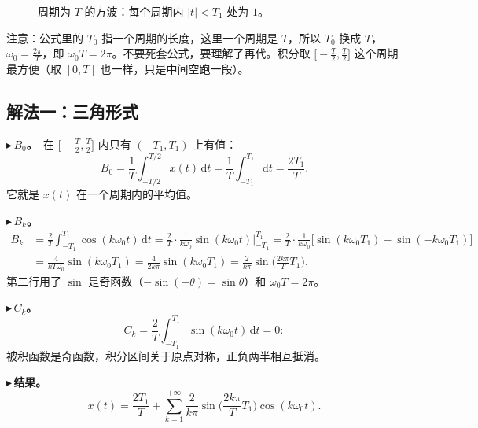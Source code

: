 \documentclass[UTF8,a4paper,11pt]{ctexart}
\newcommand{\taxes}[5][t]{%
  \draw[->] (#2,0) -- (#3,0) node[right,font=\scriptsize] {$#1$};
  \draw[->] (0,#5) -- (0,#4);
  \node[anchor=north east,font=\tiny,gray!60!black,inner sep=1pt] at (0,-0.02) {$0$};}
\newcommand{\xt}[2]{\draw (#1,0) -- (#1,-0.1) node[anchor=north,font=\tiny,gray!60!black,fill=white,inner sep=0.6pt] {$#2$};}
\newcounter{ex}[section]
\newcommand{\point}[1]{\par\addvspace{1ex}\noindent\textcolor{ptteal}{$\blacktriangleright$\,\textbf{#1}}\ }
\begin{document}
\begin{figure}[H]
\centering
{}
\caption{周期为 $T$ 的方波：每个周期内 $|t|<T_1$ 处为 $1$。}
\end{figure}

注意：公式里的 $T_0$ 指一个周期的长度，这里一个周期是 $T$，所以 $T_0$ 换成 $T$，$\omega_0=\frac{2\pi}{T}$，即 $\omega_0T=2\pi$。不要死套公式，要理解了再代。积分取 $\big[-\frac T2,\frac T2\big]$ 这个周期最方便（取 $[0,T]$ 也一样，只是中间空跑一段）。

\subsection{解法一：三角形式}
\point{$B_0$。}在 $\big[-\frac T2,\frac T2\big]$ 内只有 $(-T_1,T_1)$ 上有值：
\[
B_0=\frac1T\int_{-T/2}^{T/2}x(t)\,\mathrm{d}t=\frac1T\int_{-T_1}^{T_1}\mathrm{d}t=\frac{2T_1}{T}.
\]
它就是 $x(t)$ 在一个周期内的平均值。

\point{$B_k$。}
\begin{align*}
B_k&=\frac2T\int_{-T_1}^{T_1}\cos(k\omega_0t)\,\mathrm{d}t=\frac2T\cdot\frac{1}{k\omega_0}\sin(k\omega_0t)\Big|_{-T_1}^{T_1}
=\frac2T\cdot\frac{1}{k\omega_0}\big[\sin(k\omega_0T_1)-\sin(-k\omega_0T_1)\big]\\
&=\frac{4}{kT\omega_0}\sin(k\omega_0T_1)=\frac{4}{2k\pi}\sin(k\omega_0T_1)=\frac{2}{k\pi}\sin\!\Big(\frac{2k\pi}{T}T_1\Big).
\end{align*}
第二行用了 $\sin$ 是奇函数（$-\sin(-\theta)=\sin\theta$）和 $\omega_0T=2\pi$。

\point{$C_k$。}
\[
C_k=\frac2T\int_{-T_1}^{T_1}\sin(k\omega_0t)\,\mathrm{d}t=0 :
\]
被积函数是奇函数，积分区间关于原点对称，正负两半相互抵消。

\point{结果。}
\[
x(t)=\frac{2T_1}{T}+\sum_{k=1}^{+\infty}\frac{2}{k\pi}\sin\!\Big(\frac{2k\pi}{T}T_1\Big)\cos(k\omega_0t).
\]
\end{document}
